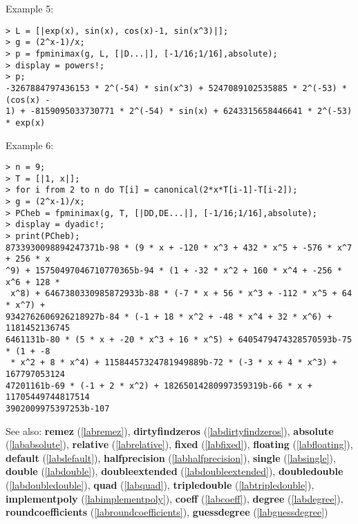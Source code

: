 \noindent Example 5: 
\begin{center}\begin{minipage}{15cm}\begin{Verbatim}[frame=single]
> L = [|exp(x), sin(x), cos(x)-1, sin(x^3)|];
> g = (2^x-1)/x;
> p = fpminimax(g, L, [|D...|], [-1/16;1/16],absolute);
> display = powers!;
> p;
-3267884797436153 * 2^(-54) * sin(x^3) + 5247089102535885 * 2^(-53) * (cos(x) - 
1) + -8159095033730771 * 2^(-54) * sin(x) + 6243315658446641 * 2^(-53) * exp(x)
\end{Verbatim}
\end{minipage}\end{center}
\noindent Example 6: 
\begin{center}\begin{minipage}{15cm}\begin{Verbatim}[frame=single]
> n = 9;
> T = [|1, x|];
> for i from 2 to n do T[i] = canonical(2*x*T[i-1]-T[i-2]);
> g = (2^x-1)/x;
> PCheb = fpminimax(g, T, [|DD,DE...|], [-1/16;1/16],absolute);
> display = dyadic!;
> print(PCheb);
8733930098894247371b-98 * (9 * x + -120 * x^3 + 432 * x^5 + -576 * x^7 + 256 * x
^9) + 15750497046710770365b-94 * (1 + -32 * x^2 + 160 * x^4 + -256 * x^6 + 128 *
 x^8) + 6467380330985872933b-88 * (-7 * x + 56 * x^3 + -112 * x^5 + 64 * x^7) + 
9342762606926218927b-84 * (-1 + 18 * x^2 + -48 * x^4 + 32 * x^6) + 1181452136745
6461131b-80 * (5 * x + -20 * x^3 + 16 * x^5) + 6405479474328570593b-75 * (1 + -8
 * x^2 + 8 * x^4) + 11584457324781949889b-72 * (-3 * x + 4 * x^3) + 167797053124
47201161b-69 * (-1 + 2 * x^2) + 18265014280997359319b-66 * x + 11705449744817514
3902009975397253b-107
\end{Verbatim}
\end{minipage}\end{center}
See also: \textbf{remez} (\ref{labremez}), \textbf{dirtyfindzeros} (\ref{labdirtyfindzeros}), \textbf{absolute} (\ref{lababsolute}), \textbf{relative} (\ref{labrelative}), \textbf{fixed} (\ref{labfixed}), \textbf{floating} (\ref{labfloating}), \textbf{default} (\ref{labdefault}), \textbf{halfprecision} (\ref{labhalfprecision}), \textbf{single} (\ref{labsingle}), \textbf{double} (\ref{labdouble}), \textbf{doubleextended} (\ref{labdoubleextended}), \textbf{doubledouble} (\ref{labdoubledouble}), \textbf{quad} (\ref{labquad}), \textbf{tripledouble} (\ref{labtripledouble}), \textbf{implementpoly} (\ref{labimplementpoly}), \textbf{coeff} (\ref{labcoeff}), \textbf{degree} (\ref{labdegree}), \textbf{roundcoefficients} (\ref{labroundcoefficients}), \textbf{guessdegree} (\ref{labguessdegree})
